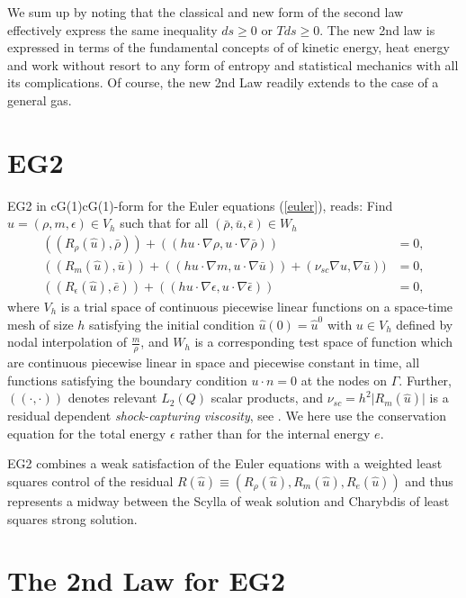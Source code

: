 We sum up by noting that the classical and new form of the second
law effectively express the same inequality $ds\ge 0$ or $Tds\ge 0$.
The new 2nd law is expressed in terms of the fundamental concepts of
of kinetic energy, heat energy and work without resort to any
form of entropy and  statistical mechanics with all its
complications. Of course, the new 2nd Law readily extends to
the case of a general gas.

\section{EG2}

EG2 in cG(1)cG(1)-form for the Euler equations (\ref{euler}), reads:
Find $\hat u =(\rho ,m,\epsilon )\in V_h$ such that for all
$(\bar\rho ,\bar u,\bar\epsilon )\in W_h$
\begin{equation}\label{cG1cG1}
\begin{split}
((R_\rho (\hat u),\bar\rho ))+((h u\cdot\nabla\rho ,
u\cdot\nabla\bar\rho ))&=0,\\
((R_m(\hat u),\bar u))+
((h u\cdot\nabla m, u\cdot\nabla\bar u))+(\nu_{sc}\nabla u,\nabla\bar u))&=0,\\
((R_\epsilon (\hat u),\bar e))+
((h u\cdot\nabla \epsilon ,u\cdot\nabla\bar\epsilon ))&=0,
\end{split}
\end{equation}
where $V_h$ is a trial space of continuous piecewise linear
functions on a space-time mesh of size $h$ satisfying the initial
condition $\hat u(0)=\hat u^0$ with $u\in V_h$ defined by
nodal interpolation of $\frac{m}{\rho}$, and $W_h$
is a corresponding test space of function which are
continuous piecewise linear in space and piecewise constant in time,
all functions satisfying the boundary condition $u\cdot n=0$ at the
nodes on
$\Gamma$. Further, $((\cdot ,\cdot ))$
denotes relevant
$L_2(Q)$ scalar products, and $\nu_{sc}=h^2\vert R_m(\hat u)\vert$ is
a residual dependent \emph{shock-capturing viscosity}, see \cite{Nazarov2009}.
We here use the conservation equation
for the total energy $\epsilon$ rather than for the internal energy
$e$.

EG2 combines a weak satisfaction of the Euler equations
with a weighted least squares control of the residual $R(\hat u)
\equiv (R_\rho (\hat u) ,R_m(\hat u),R_e(\hat u))$ and
thus represents a midway between the Scylla of weak solution and
Charybdis of least squares strong solution.



\section{The 2nd Law for EG2}

